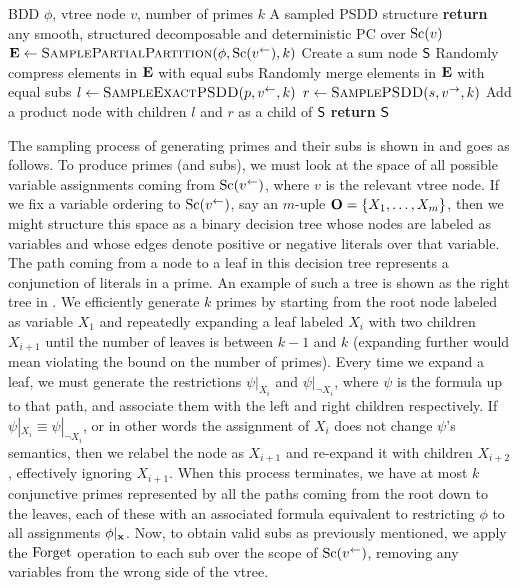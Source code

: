 \begin{algorithm}[t]
  \caption{}\label{alg:samplepsdd}
  \begin{algorithmic}[1]
    \Require BDD $\phi$, vtree node $v$, number of primes $k$
    \Ensure A sampled PSDD structure
    \ElsIf{$\phi\equiv\top$}
      \State \textbf{return} any smooth, structured decomposable and deterministic PC over $\operatorname*{\normalfont{Sc}}(v)$
      \label{alg:samplepsdd:line:top}
    \EndIf
    \State $\set{E}\gets\Call{SamplePartialPartition}{\phi,\Sc(v^\gets),k}$
    \State Create a sum node $\operatorname{\textup{\textsf{S}}}$
    \State Randomly compress elements in $\mathbf{E}$ with equal subs
    \State Randomly merge elements in $\mathbf{E}$ with equal subs
      \State $l\gets\Call{SampleExactPSDD}{p,v^\gets,k}$
      \State $r\gets\Call{SamplePSDD}{s,v^\to,k}$
      \State Add a product node with children $l$ and $r$ as a child of $\operatorname{\textup{\textsf{S}}}$
    \EndFor
    \State \textbf{return} $\operatorname{\textup{\textsf{S}}}$
  \end{algorithmic}
\end{algorithm}

The sampling process of generating primes and their subs is shown in  and
goes as follows. To produce primes (and subs), we must look at the space of all possible variable
assignments coming from $\operatorname*{\normalfont{Sc}}(v^\gets)$, where $v$ is the relevant vtree node. If we fix a variable
ordering to $\operatorname*{\normalfont{Sc}}(v^\gets)$, say an $m$-uple $\mathbf{O}=\{ X_1,\ldots,X_m\}$, then we might structure
this space as a binary decision tree whose nodes are labeled as variables and whose edges denote
positive or negative literals over that variable. The path coming from a node to a leaf in this
decision tree represents a conjunction of literals in a prime. An example of such a tree is shown
as the right tree in . We efficiently generate $k$ primes by starting from the
root node labeled as variable $X_1$ and repeatedly expanding a leaf labeled $X_i$ with two children
$X_{i+1}$ until the number of leaves is between $k-1$ and $k$ (expanding further would mean
violating the bound on the number of primes). Every time we expand a leaf, we must generate the
restrictions $\psi|_{X_i}$ and $\psi|_{\neg X_i}$, where $\psi$ is the formula up to that path, and
associate them with the left and right children respectively. If $\psi|_{X_i}\equiv\psi|_{\neg
X_i}$, or in other words the assignment of $X_i$ does not change $\psi$'s semantics, then we
relabel the node as $X_{i+1}$ and re-expand it with children $X_{i+2}$, effectively ignoring
$X_{i+1}$. When this process terminates, we have at most $k$ conjunctive primes represented by all
the paths coming from the root down to the leaves, each of these with an associated formula
equivalent to restricting $\phi$ to all assignments $\phi|_{\mathbf{x}}$. Now, to obtain valid subs as
previously mentioned, we apply the $\operatorname{\normalfont{Forget}}$ operation to each sub over the scope of
$\operatorname*{\normalfont{Sc}}(v^\gets)$, removing any variables from the wrong side of the vtree.

